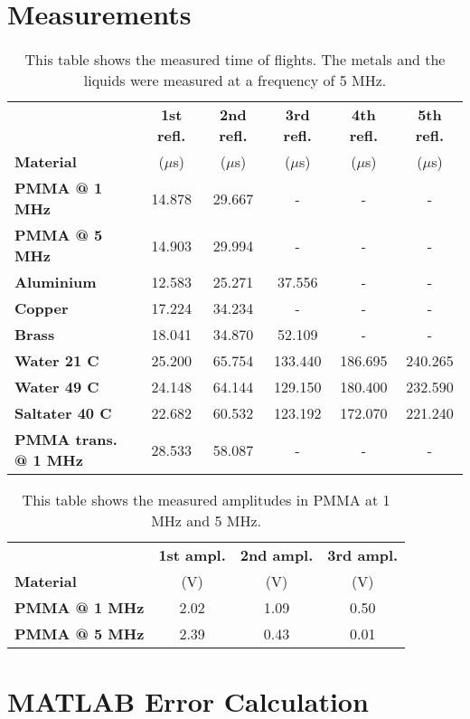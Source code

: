 \begin{appendix}
	\section{Measurements}
	\label{sec:Measurements}
	
	\begin{table}[H]
		\centering
		\begin{tabular}{l|c|c|c|c|c}
			& \textbf{1st refl.} & \textbf{2nd refl.} & \textbf{3rd refl.} & \textbf{4th refl.} & \textbf{5th refl.} \\
			\textbf{Material} & ($\mu$s) & ($\mu$s) & ($\mu$s) & ($\mu$s) & ($\mu$s) \\
			\hline\hline
			\textbf{PMMA @ 1 MHz} & 14.878 & 29.667 & - & - & - \\ \hline
			\textbf{PMMA @ 5 MHz} & 14.903 & 29.994 & - & - & - \\ \hline
			\textbf{Aluminium} & 12.583 & 25.271 & 37.556 & - & - \\ \hline
			\textbf{Copper} & 17.224 & 34.234 & - & - & - \\ \hline
			\textbf{Brass} & 18.041 & 34.870 & 52.109 & - & - \\ \hline
			\textbf{Water 21 \textdegree C} & 25.200 & 65.754 & 133.440 & 186.695 & 240.265 \\ \hline
			\textbf{Water 49 \textdegree C} & 24.148 & 64.144 & 129.150 & 180.400 & 232.590 \\ \hline
			\textbf{Saltater 40 \textdegree C} & 22.682 & 60.532 & 123.192 & 172.070 & 221.240 \\ \hline
			\textbf{PMMA trans. @ 1 MHz} & 28.533 & 58.087 & - & - & - \\ \hline
		\end{tabular}
		\caption{This table shows the measured time of flights. The metals and the liquids were measured at a frequency of 5 MHz.}
		\label{tab:Slit_Measurements}
	\end{table}

	\begin{table}[H]
		\centering
		\begin{tabular}{l|c|c|c}
			& \textbf{1st ampl.} & \textbf{2nd ampl.} & \textbf{3rd ampl.} \\
			\textbf{Material} & (V) & (V) & (V) \\
			\hline\hline
			\textbf{PMMA @ 1 MHz} & 2.02 & 1.09 & 0.50 \\ \hline
			\textbf{PMMA @ 5 MHz} & 2.39 & 0.43 & 0.01 \\ \hline
		\end{tabular}
		\caption{This table shows the measured amplitudes in PMMA at 1 MHz and 5 MHz.}
		\label{tab:Slit_Measurements}
	\end{table}

	\newpage

	\section{MATLAB Error Calculation}
	\label{sec:MATLAB_Error_Calculation}
	
\end{appendix}
